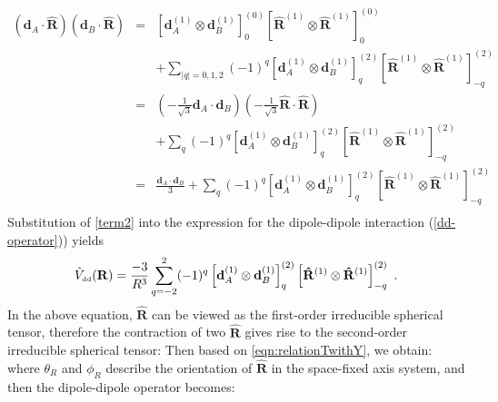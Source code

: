 \begin{eqnarray}
(\mathbf{d}_{A}\cdot \mathbf{\hat{R} })(\mathbf{d}_{B}\cdot\mathbf{\hat{R} })&=&\left[ \mathbf{d}_{A}^{(1)} \otimes \mathbf{d}_{B}^{(1)} \right]^{(0)}_{0} \left[ \mathbf{\hat{R}}^{(1)} \otimes \mathbf{\hat{R}}^{(1)} \right]^{(0)}_{0} \nonumber \\
& & + \sum_{|q|=0,1,2} (-1)^{q} \left[ \mathbf{d}_{A}^{(1)} \otimes \mathbf{d}_{B}^{(1)} \right]^{(2)}_{q} \left[ \mathbf{\hat{R}}^{(1)} \otimes \mathbf{\hat{R}}^{(1)} \right]^{(2)}_{-q} \nonumber \\
&=& (-\frac{1}{\sqrt{3}} \mathbf{d}_{A}\cdot \mathbf{d}_{B})(-\frac{1}{\sqrt{3}}\mathbf{\hat{R}}\cdot\mathbf{\hat{R}} ) \nonumber \\
& & +  \sum_{q} (-1)^{q} \left[ \mathbf{d}_{A}^{(1)} \otimes \mathbf{d}_{B}^{(1)} \right]^{(2)}_{q} \left[ \mathbf{\hat{R}}^{(1)} \otimes \mathbf{\hat{R}}^{(1)} \right]^{(2)}_{-q} \nonumber \\
&=& \frac{\mathbf{d}_{A}\cdot \mathbf{d}_{B}}{3}+  \sum_{q} (-1)^{q} \left[ \mathbf{d}_{A}^{(1)} \otimes \mathbf{d}_{B}^{(1)} \right]^{(2)}_{q} \left[ \mathbf{\hat{R}}^{(1)} \otimes \mathbf{\hat{R}}^{(1)} \right]^{(2)}_{-q} \nonumber \\ 
\label{term2}
\end{eqnarray}
Substitution of \autoref{term2} into the expression for the dipole-dipole interaction (\autoref{dd-operator})) yields
\begin{equation}
\hat{V}_{\mbox{\tiny dd}}(\mathbf{R}) = \frac{-3}{R^{3}} \sum_{q=-2}^{2} (-1)^{q} \left[ \mathbf{d}_{A}^{(1)} \otimes \mathbf{d}_{B}^{(1)} \right]^{(2)}_{q} \left[ \mathbf{\hat{R}}^{(1)} \otimes \mathbf{\hat{R}}^{(1)} \right]^{(2)}_{-q} \ .
\end{equation}
In the above equation, $\mathbf{\hat{R}}$ can be viewed as the first-order irreducible spherical tensor, therefore the
contraction of two $\mathbf{\hat{R}}$ gives rise to the second-order  irreducible spherical tensor:
Then based on \autoref{eqn:relationTwithY}, we obtain:
where $\theta_{R}$ and $\phi_{R}$ describe the orientation of $\mathbf{\hat{R}}$ in the space-fixed axis system, and
then the dipole-dipole operator becomes:

